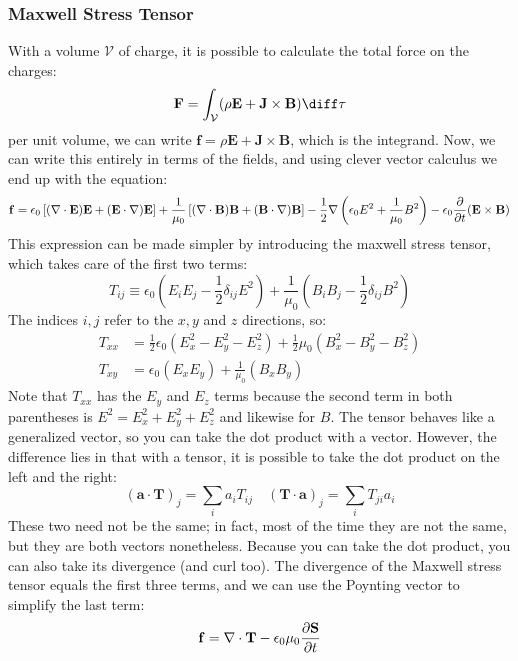 \documentclass[10pt]{article}
\begin{document}
	\subsubsection{Maxwell Stress Tensor}
	With a volume \( \mathcal{V} \) of charge, it is possible to calculate the total force on the charges:
	\[
		\mathbf{F} = \int_{\mathcal{V}}(\rho \mathbf{E} + \mathbf{J} \times \mathbf{B}) \diff \tau
	\]
	per unit volume, we can write \( \mathbf{f} = \rho \mathbf{E} + \mathbf{J} \times \mathbf{B} \), which is
	the integrand. Now, we can write this entirely in terms of the fields, and using clever vector calculus
	we end up with the equation: 
	\[
		\mathbf{f} = \epsilon_0\left[ (\nabla \cdot \mathbf{E}) \mathbf{E} + (\mathbf{E} \cdot \nabla)\mathbf{E}
		\right]  + \frac{1}{\mu_0}\left[ (\nabla \cdot \mathbf{B})\mathbf{B} + (\mathbf{B} \cdot
		\nabla)\mathbf{B} \right] - \frac{1}{2}\nabla\left( \epsilon_0 E^2 + \frac{1}{\mu_0}B^2 \right) -
		\epsilon_0 \pdv{t}(\mathbf{E} \times \mathbf{B})
	\]
	This expression can be made simpler by introducing the maxwell stress tensor, which takes care of the
	first two terms:
	\[
		T_{ij} \equiv \epsilon_0 \left( E_i E_j - \frac{1}{2}\delta_{ij}E^2 \right) + \frac{1}{\mu_0}\left(
		B_iB_j - \frac{1}{2}\delta_{ij}B^2 \right)
	\]
	The indices \( i,j  \) refer to the \( x,y \) and \( z \) directions, so:
	\begin{align*}
		T_{x x} &= \frac{1}{2}\epsilon_0\left( E_x^2 - E_y^2 - E_z^2 \right) + \frac{1}{2}\mu_0\left( B_x^2 -
		B_y^2 - B_z^2\right)\\
		T_{xy} &= \epsilon_0(E_x E_y) + \frac{1}{\mu_0}(B_x B_y)
	\end{align*}
	Note that \( T_{x x} \) has the \( E_y \) and \( E_z \) terms because the second term in both parentheses
	is \( E^2 = E_x^2 + E_y^2 + E_z^2\) and likewise for \( B \). The tensor behaves like a generalized
	vector, so you can take the dot product with a vector. However, the difference lies in that with a
	tensor, it is possible to take the dot product on the left and the right:
	\[
		\left(\mathbf{a} \cdot \mathbf{T}\right)_j = \sum_{i}a_i T_{ij} \quad \left( \mathbf{T} \cdot
		\mathbf{a} \right)_j = \sum_i T_{ji}a_i
	\]
	These two need not be the same; in fact, most of the time they are not the same, but they are both
	vectors nonetheless. Because you can take the dot product, you can also take its divergence (and curl
	too). The divergence of the Maxwell stress tensor equals the first three terms, and we can use the
	Poynting vector to simplify the last term:
	\[
		\mathbf{f} = \nabla \cdot \mathbf{T} - \epsilon_0\mu_0 \pdv{\mathbf{S}}{t}
	\]
\end{document}

